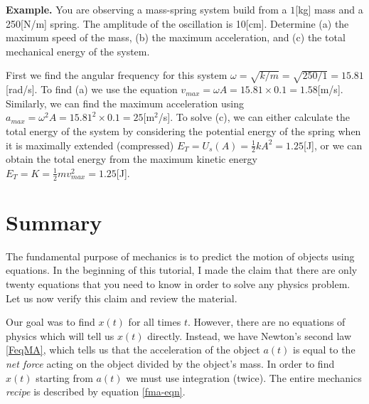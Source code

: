\documentclass[letterpaper,9pt,journal]{IEEEtran}
\begin{document}
{ \bf Example.} 
You are observing a mass-spring system build from a $1$[kg] mass and a 250[N/m] spring.
The amplitude of the oscillation is 10[cm]. Determine (a) the maximum speed of the mass, 
(b) the maximum acceleration, and (c) the total mechanical energy of the system.

First we find the angular frequency for this system $\omega = \sqrt{k/m}=\sqrt{250/1}=15.81$[rad/s].
To find (a) we use the equation $v_{max} = \omega A = 15.81 \times 0.1=1.58$[m/s].
Similarly, we can find the maximum acceleration using $a_{max} = \omega^2 A = 15.81^2 \times 0.1=25$[m$^2$/s].
To solve (c), we can either calculate the total energy of the system by considering the potential energy of the 
spring when it is maximally extended (compressed) $E_T=U_s(A) = \frac{1}{2}kA^2 = 1.25$[J], 
or we can obtain the total energy from the maximum kinetic energy $E_T=K=\frac{1}{2}m v_{max}^2 = 1.25$[J].




\section*{Summary}

The fundamental purpose of mechanics is to predict the motion of objects using equations.
In the beginning of this tutorial, I made the claim that there are only twenty 
equations that you need to know in order to solve any physics problem.
%
Let us now verify this claim and review the material.

Our goal was to find $x(t)$ for all times $t$.
However, there are no equations of physics which will tell us $x(t)$ directly.
Instead, we have Newton's second law \eqref{FeqMA},
which tells us that the acceleration of the object $a(t)$
is equal to the \emph{net force} acting on the object divided by the object's mass.
In order to find $x(t)$ starting from $a(t)$ we must use integration (twice).
The entire mechanics \emph{recipe} is described by equation \eqref{fma-eqn}.

\end{document}
